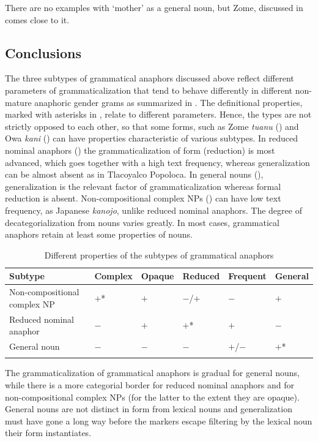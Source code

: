 \documentclass[output=collectionpaper]{langsci/langscibook}
\begin{document}
There are no examples with ‘mother’ as a general noun, but Zome, discussed in  comes close to it.


\subsection{Conclusions}
\label{sec:BW:5.5}

The three subtypes of grammatical anaphors discussed above reflect different parameters of grammaticalization that tend to behave differently in different non-mature anaphoric gender grams as summarized in . The definitional properties, marked with asterisks in , relate to different parameters. Hence, the types are not strictly opposed to each other, so that some forms, such as Zome \textit{tuanu} () and Owa \textit{kani} () can have properties characteristic of various subtypes. In reduced nominal anaphors () the grammaticalization of form (reduction) is most advanced, which goes together with a high text frequency, whereas generalization can be almost absent as in Tlacoyalco Popoloca. In general nouns (), generalization is the relevant factor of grammaticalization whereas formal reduction is absent. Non-compositional complex NPs () can have low text frequency, as Japanese \textit{kanojo}, unlike reduced nominal anaphors. The degree of decategorialization from nouns varies greatly. In most cases, grammatical anaphors retain at least some properties of nouns.


\begin{table}
\begin{tabular}{llllll}
\lsptoprule
Subtype	&	Complex	&	Opaque	&	Reduced	&	Frequent	&	General	\\
\midrule
Non-compositional complex NP	&	$+$*	&	$+$	&	$-$/$+$	&	$-$	&	$+$	\\
Reduced nominal anaphor	&	$-$	&	$+$	&	$+$*	&	$+$	&	$-$	\\
General noun	&	$-$	&	$-$	&	$-$	&	$+$/$-$	&	$+$*	\\
\lspbottomrule
\end{tabular}
\caption{Different properties of the subtypes of grammatical anaphors}
\label{tab:BW:10}
\end{table}

The grammaticalization of grammatical anaphors is gradual for general nouns, while there is a more categorial border for reduced nominal anaphors and for non-compositional complex NPs (for the latter to the extent they are opaque). General nouns are not distinct in form from lexical nouns and generalization must have gone a long way before the markers escape filtering by the lexical noun their form instantiates.
\end{document}
